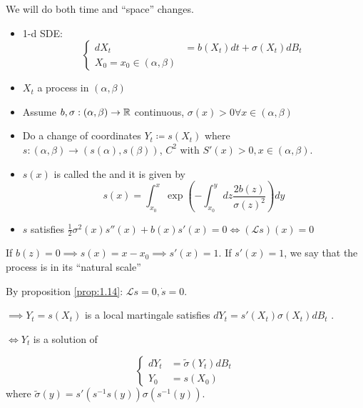 We will do both time and ``space'' changes. 
\begin{itemize}
    \item 1-d SDE:\begin{equation}\label{eq:1.4}\begin{cases}
        dX_t&=b(X_t)dt+\sigma(X_t)dB_t\\
        X_0=x_0\in(\alpha,\beta)
    \end{cases}\end{equation}
    \item  $X_t$ a process in $(\alpha,\beta)$
    \item Assume $b,\sigma:(\alpha,\beta)\to\mathbb{R}$ continuous, $\sigma(x)>0\forall x\in (\alpha,\beta)$
    \item Do a change of coordinates $Y_t\coloneqq s(X_t)$ where $s:(\alpha,\beta)\to(s(\alpha),s(\beta))$, $C^2$ with $S'(x)>0,x\in (\alpha,\beta)$.
    \item $s(x)$ is called the  and it is given by \[s(x)=\int_{x_0}^x\exp\left(-\int_{x_0}^{y}dz\frac{2b(z)}{\sigma(z)^2}\right)dy\]
    \item $s$ satisfies $\frac{1}{2}\sigma^2(x)s''(x)+b(x)s'(x)=0\iff (\mathcal{L}s)(x)=0$ 
\end{itemize}

\begin{remark}
    If $b(z)=0\implies s(x)=x-x_0\implies s'(x)=1$. If $s'(x)=1$, we say that the process is in its ``natural scale''
\end{remark}

By proposition \ref{prop:1.14}: $\mathcal{L}s=0,\dot{s}=0$.

$\implies Y_t=s(X_t)$ is a local martingale satisfies $dY_t=s'(X_t)\sigma(X_t)dB_t$ .  

$\iff Y_t$ is a solution of 

\begin{equation}\label{eq:1.5}
    \begin{cases}
        dY_t&=\tilde{\sigma}(Y_t)dB_t\\
        Y_0&=s(X_0)
    \end{cases}
\end{equation}
where $\tilde{\sigma}(y)=s'(s^{-1}s(y))\sigma(s^{-1}(y))$.


